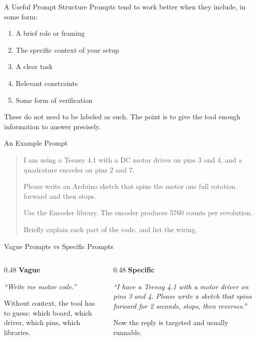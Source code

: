 \documentclass[aspectratio=169,11pt]{beamer}
\begin{document}
\begin{frame}{A Useful Prompt Structure}
  Prompts tend to work better when they include, in some form:
  \vfill
  \begin{enumerate}
    \setlength\itemsep{0.4em}
    \item A brief role or framing
    \item The specific context of your setup
    \item A clear task
    \item Relevant constraints
    \item Some form of verification
  \end{enumerate}
  \vfill
  These do not need to be labeled as such. The point is to give the tool enough information to answer precisely.
\end{frame}

\begin{frame}{An Example Prompt}
  \footnotesize
  \begin{quote}
    I am using a Teensy 4.1 with a DC motor driver on pins 3 and 4, and a quadrature encoder on pins 2 and 7.
    \medskip

    Please write an Arduino sketch that spins the motor one full rotation forward and then stops.
    \medskip

    Use the Encoder library. The encoder produces 5760 counts per revolution.
    \medskip

    Briefly explain each part of the code, and list the wiring.
  \end{quote}
\end{frame}

\begin{frame}{Vague Prompts vs Specific Prompts}
  \begin{columns}[T,onlytextwidth]
    \begin{column}{0.48\textwidth}
      \textbf{Vague}
      \vspace{0.4em}

      \itshape ``Write me motor code.''
      \vspace{0.8em}

      \normalfont
      Without context, the tool has to guess: which board, which driver, which pins, which libraries.
    \end{column}
    \begin{column}{0.48\textwidth}
      \textbf{Specific}
      \vspace{0.4em}

      \itshape ``I have a Teensy 4.1 with a motor driver on pins 3 and 4. Please write a sketch that spins forward for 2 seconds, stops, then reverses.''
      \vspace{0.8em}

      \normalfont
      Now the reply is targeted and usually runnable.
    \end{column}
  \end{columns}
\end{frame}
\end{document}
